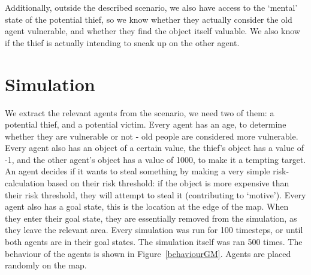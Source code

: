 Additionally, outside the described scenario, we also have access to the `mental' state of the potential thief, so we know whether they actually consider the old agent vulnerable, and whether they find the object itself valuable. We also know if the thief is actually intending to sneak up on the other agent.


\section{Simulation}

We extract the relevant agents from the scenario, we need two of them: a potential thief, and a potential victim. Every agent has an age, to determine whether they are vulnerable or not - old people are considered more vulnerable. Every agent also has an object of a certain value, the thief's object has a value of -1, and the other agent's object has a value of 1000, to make it a tempting target. An agent decides if it wants to steal something by making a very simple risk-calculation based on their risk threshold: if the object is more expensive than their risk threshold, they will attempt to steal it (contributing to `motive'). Every agent also has a goal state, this is the location at the edge of the map. When they enter their goal state, they are essentially removed from the simulation, as they leave the relevant area. Every simulation was run for 100 timesteps, or until both agents are in their goal states. The simulation itself was ran 500 times. The behaviour of the agents is shown in Figure~\ref{behaviourGM}. Agents are placed randomly on the map.

